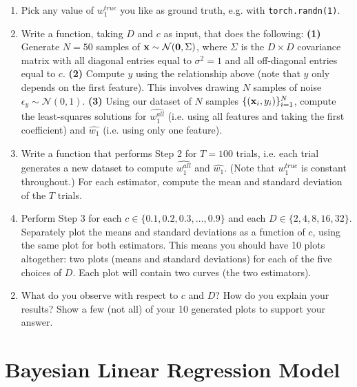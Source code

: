 \documentclass[11pt]{article}
\begin{document}
\begin{enumerate}

    \item Pick any value of $w_1^{true}$ you like as ground truth, e.g. with \texttt{torch.randn(1)}.

    \item Write a function, taking $D$ and $c$ as input, that does the following: \textbf{(1)} Generate $N=50$ samples of ${\mathbf x} \sim \mathcal{N}(\mathbf{0},\Sigma)$, where  $\Sigma$ is the $D \times D$ covariance matrix with all diagonal entries equal to $\sigma^2 = 1$ and all off-diagonal entries equal to $c$. \textbf{(2)} Compute $y$ using the relationship above (note that $y$ only depends on the first feature). This involves drawing $N$ samples of noise $\epsilon_y \sim \mathcal{N}(0,1)$. \textbf{(3)} Using our dataset of $N$ samples $\{({\mathbf x}_i,y_i)\}^N_{i=1}$, compute the least-squares solutions for $\widehat{w_1^{all}}$ (i.e. using all features and taking the first coefficient) and $\widehat{w_1}$ (i.e. using only one feature).

    \item Write a function that performs Step 2 for $T=100$ trials, i.e. each trial generates a new dataset to compute $\widehat{w_1^{all}}$ and $\widehat{w_1}$. (Note that $w_1^{true}$ is constant throughout.) For each estimator, compute the mean and standard deviation of the $T$ trials.

    \item Perform Step 3 for each $c \in \{0.1,0.2,0.3,\ldots,0.9\}$ and each $D \in \{2,4,8,16,32\}$. Separately plot the means and standard deviations as a function of $c$, using the same plot for both estimators. This means you should have 10 plots altogether: two plots (means and standard deviations) for each of the five choices of $D$. Each plot will contain two curves (the two estimators).
\end{enumerate}

\begin{enumerate}[label=(\Alph*)]
\setcounter{enumi}{1}

    \item What do you observe with respect to $c$ and $D$? How do you explain your results? Show a few (not all) of your 10 generated plots to support your answer.

\end{enumerate}

\newpage
\section{Bayesian Linear Regression Model}
\end{document}
